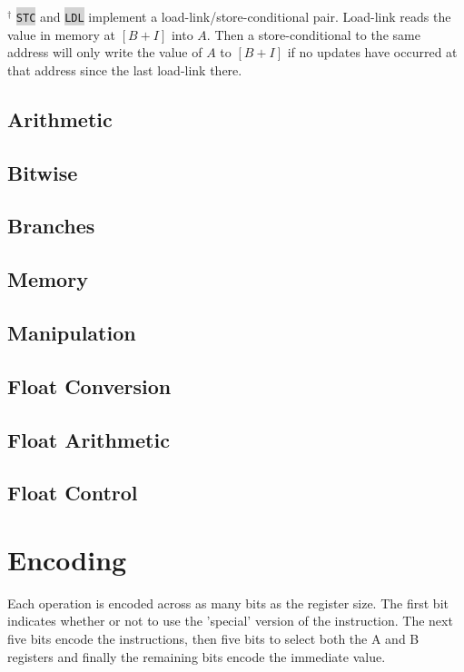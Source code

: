 \documentclass{article}
\newcommand{\labcode}[1]{\colorbox{lightgray}{\lstinline[language=lab]{#1}}}
\begin{document}
$^\dagger$ \labcode{STC} and \labcode{LDL} implement a
load-link/store-conditional pair. Load-link reads the value in memory at $[B +
I]$ into $A$. Then a store-conditional to the same address will only write the
value of $A$ to $[B + I]$ if no updates have occurred at that address since the
last load-link there.

\subsection{Arithmetic}

\subsection{Bitwise}

\subsection{Branches}

\subsection{Memory}

\subsection{Manipulation}

\subsection{Float Conversion}

\subsection{Float Arithmetic}

\subsection{Float Control}

\section{Encoding}

Each operation is encoded across as many bits as the register size. The first
bit indicates whether or not to use the 'special' version of the instruction.
The next five bits encode the instructions, then five bits to select both the A
and B registers and finally the remaining bits encode the immediate value.
\end{document}
